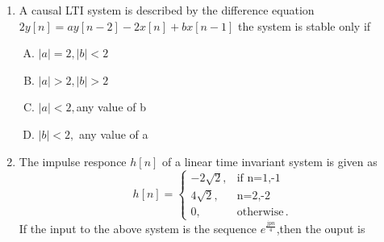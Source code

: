 \documentclass[journal,12pt,twocolumn]{IEEEtran}
\begin{document}
\begin{enumerate}
\begin{enumerate}[(A)]
\end{enumerate}

\item A causal LTI system is described by the difference equation $2y[n]=ay[n-2]-2x[n]+bx[n-1]$ \newline the system is stable only if
\begin{enumerate}[(A)]

\setlength\itemsep{1em}
\item $|a|=2,|b|<2$
\item $|a|>2,|b|>2$
\item $|a|<2,$any value of b
\item $|b|<2,$ any value of a


\end{enumerate}

%
%





\item The impulse responce $h[n]$ of a linear time invariant system is given as
\[
	h[n]=\begin{cases}
		-2\sqrt{2}, & \text{if n=1,-1 }  \\
		4\sqrt{2}, & \text{n=2,-2 }\\
		0,&\text{otherwise}\,.
	\end{cases}
\] 
\newline If the input to the above system is the sequence $e^{\frac{jpn}{4}}$,then the ouput is

\begin{enumerate}[(A)]
\end{enumerate}


\end{enumerate}
\end{document}
